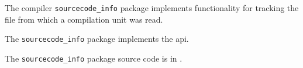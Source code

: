 
The compiler {\tt sourcecode\_info} package implements functionality for tracking 
the file from which a compilation unit was read.

The {\tt sourcecode\_info} package implements the  api.

The {\tt sourcecode\_info} package source code is in .

